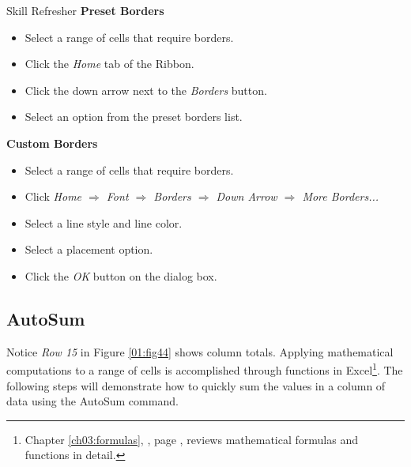 \begin{center}
	\begin{sklbox}{Skill Refresher}
		\textbf{Preset Borders}
		\\
		\begin{itemize}
			\setlength{\itemsep}{0pt}
			\setlength{\parskip}{0pt}
			\setlength{\parsep}{0pt}
			
			\item Select a range of cells that require borders.
			\item Click the \textit{Home} tab of the Ribbon.
			\item Click the down arrow next to the \textit{Borders} button.
			\item Select an option from the preset borders list.
			
		\end{itemize}

		\hfill \break
		\textbf{Custom Borders}
		\\
		\begin{itemize}
			\setlength{\itemsep}{0pt}
			\setlength{\parskip}{0pt}
			\setlength{\parsep}{0pt}
			
			\item Select a range of cells that require borders.
			\item Click \textit{Home $ \Rightarrow $ Font $ \Rightarrow $ Borders $ \Rightarrow $ Down Arrow $ \Rightarrow $ More Borders...}
			\item Select a line style and line color.
			\item Select a placement option.
			\item Click the \textit{OK} button on the dialog box.
			
		\end{itemize}

	\end{sklbox}
\end{center}

\subsection{AutoSum}

Notice \textit{Row 15} in Figure \ref{01:fig44} shows column totals. Applying mathematical computations to a range of cells is accomplished through functions in Excel\footnote{Chapter \ref{ch03:formulas}, , page \pageref{ch03:formulas}, reviews mathematical formulas and functions in detail.}. The following steps will demonstrate how to quickly sum the values in a column of data using the AutoSum command.

